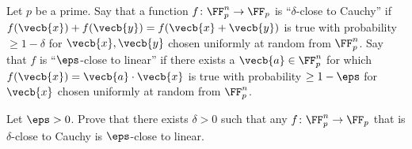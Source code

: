 Let $p$ be a prime. Say that a function $f\colon\FF_p^n\to\FF_p$ is ``$\delta$-close to Cauchy'' if $f(\vecb{x})+f(\vecb{y})=f(\vecb{x}+\vecb{y})$ is true with probability $\geq1-\delta$ for $\vecb{x},\vecb{y}$ chosen uniformly at random from $\FF_p^n$. Say that $f$ is ``$\eps$-close to linear'' if there exists a $\vecb{a}\in\FF_p^n$ for which $f(\vecb{x})=\vecb{a}\cdot\vecb{x}$ is true with probability $\geq1-\eps$ for $\vecb{x}$ chosen uniformly at random from $\FF_p^n$.

Let $\eps>0$. Prove that there exists $\delta>0$ such that any $f\colon\FF_p^n\to\FF_p$ that is $\delta$-close to Cauchy is $\eps$-close to linear.